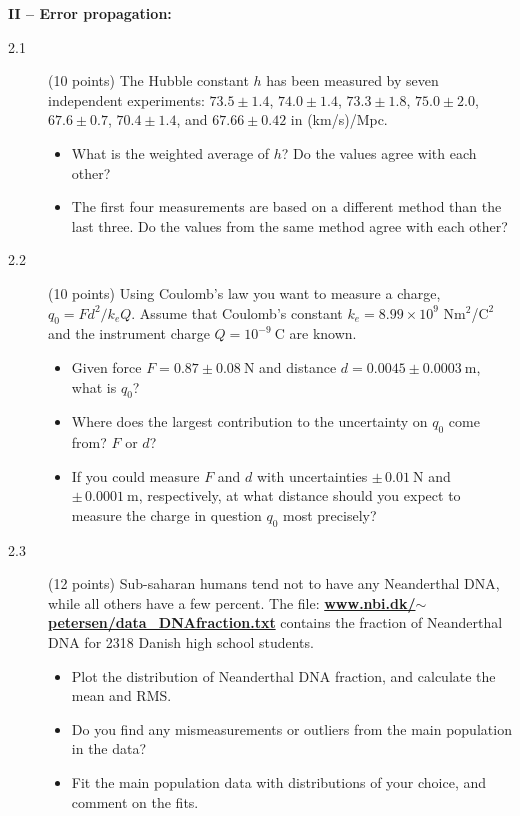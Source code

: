 \documentclass[11pt]{article}
\begin{document}

\vspace{2ex}
\noindent
{\bf II -- Error propagation:}
\begin{description}
\item[2.1] (10 points)
  The Hubble constant $h$ has been measured by seven independent experiments:
  $73.5 \pm 1.4$,         %
  $74.0 \pm 1.4$,         %
  $73.3 \pm 1.8$,         %
  $75.0 \pm 2.0$,         %
  $67.6 \pm 0.7$,         %
  $70.4 \pm 1.4$, and     %
  $67.66 \pm 0.42$        %
  in (km/s)/Mpc.
  \vspace*{-1ex}
  \begin{itemize}
    \item What is the weighted average of $h$? Do the values agree with each other?
    \item The first four measurements are based on a different method than the last three.
      Do the values from the same method agree with each other?
  \end{itemize}
%
\item[2.2] (10 points) 
  Using Coulomb's law you want to measure a charge, $q_0 = F d^2 / k_e Q$. Assume that Coulomb's constant
  $k_e = 8.99 \times 10^9$ N$\mbox{m}^2$/$\mbox{C}^2$ and the instrument charge $Q = 10^{-9}~\mbox{C}$ are known.
  \vspace*{-1ex}
  \begin{itemize}
    \item Given force $F = 0.87 \pm 0.08~\mbox{N}$ and distance $d = 0.0045 \pm 0.0003~\mbox{m}$, what is $q_0$?
    \item Where does the largest contribution to the uncertainty on $q_0$ come from? $F$ or $d$?
    \item If you could measure $F$ and $d$ with uncertainties $\pm\, 0.01~\mbox{N}$ and $\pm\, 0.0001~\mbox{m}$,
      respectively, at what distance should you expect to measure the charge in question $q_0$ most precisely?
  \end{itemize}
%
\item[2.3] (12 points)
  Sub-saharan humans tend not to have any Neanderthal DNA, while all others have a few percent. The file:
  \href{http://www.nbi.dk/~petersen/data\_NeanderthalDNA.txt}{\bf www.nbi.dk/$\sim$petersen/data\_DNAfraction.txt}
  contains the fraction of Neanderthal DNA for 2318 Danish high school students.
  \vspace*{-1ex}
  \begin{itemize}
    \item Plot the distribution of Neanderthal DNA fraction, and calculate the mean and RMS.
    \item Do you find any mismeasurements or outliers from the main population in the data?
    \item Fit the main population data with distributions of your choice, and comment on the fits.
  \end{itemize}
\end{description}
\end{document}
